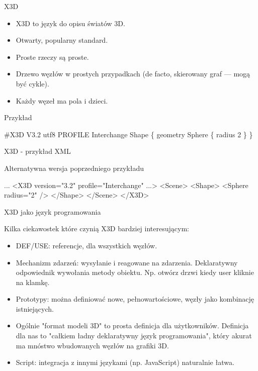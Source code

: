 \documentclass{beamer}
\begin{document}
\begin{frame}[fragile]{X3D}

\begin{itemize}
  \item X3D to język do opisu światów 3D.
  \item Otwarty, popularny standard.
  \item Proste rzeczy są proste.
  \item Drzewo węzłów w prostych przypadkach (de facto, skierowany graf
    --- mogą być cykle).
  \item Każdy węzeł ma pola i dzieci.
\end{itemize}

\begin{exampleblock}{Przykład}
\begin{semiverbatim}
\#X3D V3.2 utf8
PROFILE Interchange
Shape \{
  geometry Sphere \{ radius 2 \}
\}
\end{semiverbatim}
\end{exampleblock}
\end{frame}

\begin{frame}[fragile]{X3D - przykład XML}

\begin{exampleblock}{Alternatywna wersja poprzedniego przykładu}
\begin{semiverbatim}
...
<X3D version="3.2" profile="Interchange" ...>
  <Scene>
    <Shape>
      <Sphere radius="2" />
    </Shape>
  </Scene>
</X3D>
\end{semiverbatim}
\end{exampleblock}

\end{frame}

\begin{frame}{X3D jako język programowania}

Kilka ciekawostek które czynią X3D bardziej interesującym:

\begin{itemize}
  \item DEF/USE: referencje, dla wszystkich węzłów.
  \item Mechanizm zdarzeń: wysyłanie i reagowane na zdarzenia.
    Deklaratywny odpowiednik wywołania metody obiektu.
    Np. otwórz drzwi kiedy user kliknie na klamkę.
  \item Prototypy: można definiować nowe, pełnowartościowe,
    węzły jako kombinację istniejących.
  \item Ogólnie "format modeli 3D" to prosta definicja dla użytkowników.
    Definicja dla nas to "całkiem ładny deklaratywny język programowania",
    który akurat ma mnóstwo wbudowanych węzłów na grafiki 3D.
  \item Script: integracja z innymi językami (np. JavaScript) naturalnie łatwa.
\end{itemize}
\end{frame}
\end{document}
